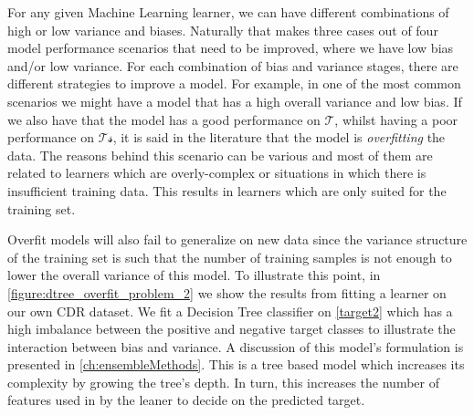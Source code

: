 For any given Machine Learning learner, we can have different combinations of high or low variance and biases.
Naturally that makes three cases out of four model performance scenarios that need to be improved, where we have low bias and/or low variance.
For each combination of bias and variance stages, there are different strategies to improve a model.
For example, in one of the most common scenarios we might have a model that has a high overall variance and low bias.
If we also have that the model has a good performance on $\mathcal{T}$, whilst having a poor performance on $\mathcal{Ts}$, it is said in the literature that the model is \textit{overfitting} the data.
The reasons behind this scenario can be various and most of them are related to learners which are overly-complex or situations in which there is insufficient training data.
This results in learners which are only suited for the training set.


Overfit models will also fail to generalize on new data since the variance structure of the training set is such that the number of training samples is not enough to lower the overall variance of this model.
To illustrate this point, in \cref{figure:dtree_overfit_problem_2} we show the results from fitting a learner on our own CDR dataset.
We fit a Decision Tree classifier on \cref{target2} which has a high imbalance between the positive and negative target classes to illustrate the interaction between bias and variance.
A discussion of this model's formulation is presented in \cref{ch:ensembleMethods}.
This is a tree based model which increases its complexity by growing the tree's depth.
In turn, this increases the number of features used in by the leaner to decide on the predicted target.



